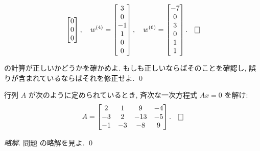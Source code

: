 \documentclass[12pt,twoside]{jarticle}
\newcommand\commentout[1]{#1}
\newcommand\commentout[1]{}
\begin{document}
\begin{example}
\begin{equation*}
\begin{bmatrix}
      0 \\
      0 \\
      0 \\
    \end{bmatrix},
    \quad
    w^{(4)} =
    \begin{bmatrix}
      3 \\
      0 \\
      -1 \\
      1 \\
      0 \\
      0 \\
    \end{bmatrix},
    \quad
    w^{(6)} =
    \begin{bmatrix}
      -7 \\
      0 \\
      3 \\
      0 \\
      1 \\
      1 \\
    \end{bmatrix}.
    \qed
  \end{equation*}
\end{example}

\begin{question}
  の計算が正しいかどうかを確かめよ.
  もしも正しいならばそのことを確認し, 誤りが含まれているならばそれを修正せよ.
  \qed
\end{question}


\begin{question}
  \label{q:sol-hom-1}
  行列 $A$ が次のように定められているとき, 
  斉次な一次方程式 $Ax=0$ を解け:
  \begin{equation*}
    A = 
    \begin{bmatrix}
       2 &  1 &   9 & -4 \\
      -3 &  2 & -13 & -5 \\
      -1 & -3 &  -8 &  9 \\
    \end{bmatrix}.
    \qed
  \end{equation*}
\end{question}

\commentout{
\begin{proof}[略解]
  問題  の略解を見よ. \qed
\end{proof}
}
\end{document}
